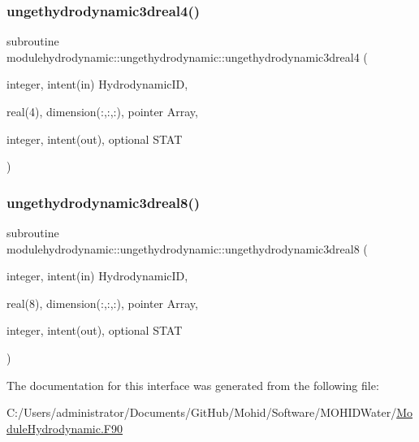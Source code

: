 \mbox{\label{interfacemodulehydrodynamic_1_1ungethydrodynamic_a8fac01b4713e981baed20dfef5137953}} 
\subsubsection{\texorpdfstring{ungethydrodynamic3dreal4()}{ungethydrodynamic3dreal4()}}
{\footnotesize\ttfamily subroutine modulehydrodynamic\+::ungethydrodynamic\+::ungethydrodynamic3dreal4 (\begin{DoxyParamCaption}\item[{integer, intent(in)}]{Hydrodynamic\+ID,  }\item[{real(4), dimension(\+:,\+:,\+:), pointer}]{Array,  }\item[{integer, intent(out), optional}]{S\+T\+AT }\end{DoxyParamCaption})\hspace{0.3cm}{\ttfamily [private]}}

\mbox{\label{interfacemodulehydrodynamic_1_1ungethydrodynamic_a347de76335b7783f650d0a119056774c}} 
\subsubsection{\texorpdfstring{ungethydrodynamic3dreal8()}{ungethydrodynamic3dreal8()}}
{\footnotesize\ttfamily subroutine modulehydrodynamic\+::ungethydrodynamic\+::ungethydrodynamic3dreal8 (\begin{DoxyParamCaption}\item[{integer, intent(in)}]{Hydrodynamic\+ID,  }\item[{real(8), dimension(\+:,\+:,\+:), pointer}]{Array,  }\item[{integer, intent(out), optional}]{S\+T\+AT }\end{DoxyParamCaption})\hspace{0.3cm}{\ttfamily [private]}}



The documentation for this interface was generated from the following file\+:\begin{DoxyCompactItemize}
\item 
C\+:/\+Users/administrator/\+Documents/\+Git\+Hub/\+Mohid/\+Software/\+M\+O\+H\+I\+D\+Water/\mbox{\hyperlink{_module_hydrodynamic_8_f90}{Module\+Hydrodynamic.\+F90}}\end{DoxyCompactItemize}
